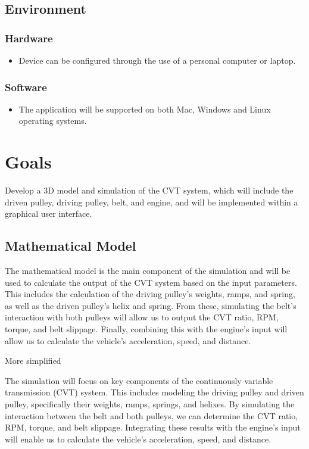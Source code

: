\documentclass{article}
\begin{document}
\subsection{Environment}
\subsubsection{Hardware}
\begin{itemize}
    \item Device can be configured through the use of a personal computer or laptop.
\end{itemize}
    \subsubsection{Software}
\begin{itemize}
    \item The application will be supported on both Mac, Windows and Linux operating
    systems.
\end{itemize}

\section{Goals}

Develop a 3D model and simulation of the CVT system, which will include the driven pulley, 
driving pulley, belt, and engine, and will be implemented within a graphical user interface.

\subsection{Mathematical Model}
The mathematical model is the main component of the simulation and will be used to 
calculate the output of the CVT system based on the input parameters.
This includes the calculation of the driving pulley's weights, ramps, and spring, 
as well as the driven pulley's helix and spring.
From these, simulating the belt's interaction with both pulleys will allow us to output 
the CVT ratio, RPM, torque, and belt slippage. Finally, combining this with the engine's input
will allow us to calculate the vehicle's acceleration, speed, and distance.

More simplified

The simulation will focus on key components of the continuously variable transmission (CVT) 
system. This includes modeling the driving pulley and driven pulley, specifically their weights,
ramps, springs, and helixes. By simulating the interaction between the belt and both pulleys, 
we can determine the CVT ratio, RPM, torque, and belt slippage. Integrating these results with 
the engine's input will enable us to calculate the vehicle's acceleration, speed, and distance.
\end{document}
